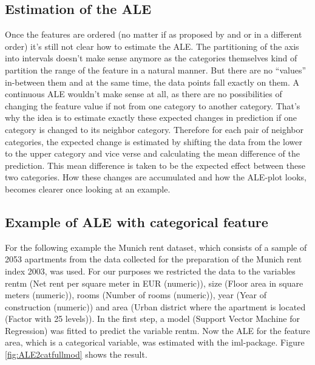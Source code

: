 \documentclass[
]{krantz}
\begin{document}
\hypertarget{estimation-of-the-ale}{%
\subsection{Estimation of the ALE}\label{estimation-of-the-ale}}

Once the features are ordered (no matter if as proposed by \citep{Apley2016} and \citep{molnar2019} or in a different order) it's still not clear how to estimate the ALE. The partitioning of the axis into intervals doesn't make sense anymore as the categories themselves kind of partition the range of the feature in a natural manner. But there are no ``values'' in-between them and at the same time, the data points fall exactly on them. A continuous ALE wouldn't make sense at all, as there are no possibilities of changing the feature value if not from one category to another category. That's why the idea is to estimate exactly these expected changes in prediction if one category is changed to its neighbor category. Therefore for each pair of neighbor categories, the expected change is estimated by shifting the data from the lower to the upper category and vice verse and calculating the mean difference of the prediction. This mean difference is taken to be the expected effect between these two categories. How these changes are accumulated and how the ALE-plot looks, becomes clearer once looking at an example.

\hypertarget{example-of-ale-with-categorical-feature}{%
\subsection{Example of ALE with categorical feature}\label{example-of-ale-with-categorical-feature}}

For the following example the Munich rent dataset, which consists of a sample of 2053 apartments from the data collected for the preparation of the Munich rent index 2003, was used. For our purposes we restricted the data to the variables rentm (Net rent per square meter in EUR (numeric)), size (Floor area in square meters (numeric)), rooms (Number of rooms (numeric)), year (Year of construction (numeric)) and area (Urban district where the apartment is located (Factor with 25 levels)). In the first step, a model (Support Vector Machine for Regression) was fitted to predict the variable rentm. Now the ALE for the feature area, which is a categorical variable, was estimated with the iml-package. Figure \ref{fig:ALE2catfullmod} shows the result.
\end{document}
